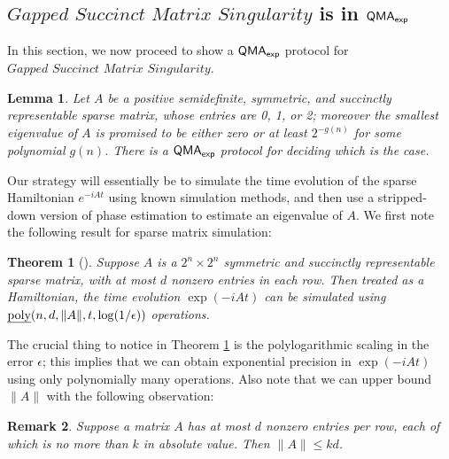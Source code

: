 \documentclass[11pt]{article}
\newtheorem{theorem}{Theorem}
\newtheorem{lemma}{Lemma}
\newtheorem{remark}[theorem]{Remark}
\theoremstyle{definition}
\theoremstyle{remark}
\newcommand\QMAexp{{\sf{QMA}_{exp}}}
\newcommand\gappedsucc{\textit{Gapped Succinct Matrix Singularity}}
\begin{document}
\subsection{$\gappedsucc$ is in $\QMAexp$}
In this section, we now proceed to show a $\QMAexp$ protocol for $\gappedsucc$.
\begin{lemma} \label{lem:qmaexp protocol}
Let $A$ be a positive semidefinite, symmetric, and succinctly representable sparse matrix, whose entries are 0, 1, or 2; moreover the smallest eigenvalue of $A$ is promised to be either zero or at least $2^{-g(n)}$ for some polynomial $g(n)$. There is a $\QMAexp$ protocol for deciding which is the case.
\end{lemma}
Our strategy will essentially be to simulate the time evolution of the sparse Hamiltonian $e^{-iAt}$ using known simulation methods, and then use a stripped-down version of phase estimation to estimate an eigenvalue of $A$. We first note the following result for sparse matrix simulation:
\begin{theorem}[\cite{berry14,berry15}] \label{thm:ham_sim}
Suppose $A$ is a $2^n \times 2^n$ symmetric and succinctly representable sparse matrix, with at most $d$ nonzero entries in each row. Then treated as a Hamiltonian, the time evolution $\exp(-iAt)$ can be simulated using $\text{\emph{poly}}(n,d,\|A\|, t, \log(1/\epsilon))$ operations.
\end{theorem}
The crucial thing to notice in Theorem \ref{thm:ham_sim} is the polylogarithmic scaling in the error $\epsilon$; this implies that we can obtain exponential precision in $\exp(-iAt)$ using only polynomially many operations. Also note that we can upper bound $\|A\|$ with the following observation:
\begin{remark}
Suppose a matrix $A$ has at most $d$ nonzero entries per row, each of which is no more than $k$ in absolute value. Then $\| A \| \le kd$.
\end{remark}
\end{document}
